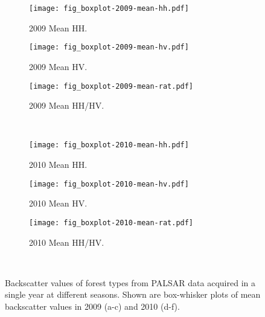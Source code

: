 \begin{landscape}
\begin{figure}[!ht] \centering
	\captionsetup[subfigure]{width=2.0in} %
	\begin{subfigure}[t]{0.43\textwidth}
		\texttt{[image: fig\_boxplot-2009-mean-hh.pdf]}
		\caption[Single year backscatter boxplots.]{2009 Mean HH.}
		\label{fig: result-box4.2a}
	\end{subfigure}
	\begin{subfigure}[t]{0.43\textwidth}
		\texttt{[image: fig\_boxplot-2009-mean-hv.pdf]}
		\caption[Single year backscatter boxplots.]{2009 Mean HV.}
		\label{fig: result-box4.2b}
	\end{subfigure}
	\begin{subfigure}[t]{0.43\textwidth}
		\texttt{[image: fig\_boxplot-2009-mean-rat.pdf]}
		\caption[Single year backscatter boxplots.]{2009 Mean HH/HV.}
		\label{fig: result-box4.2c}
	\end{subfigure}\\
	\vspace{20pt}
	\begin{subfigure}[t]{0.43\textwidth}
		\texttt{[image: fig\_boxplot-2010-mean-hh.pdf]}
		\caption[Single year backscatter boxplots.]{2010 Mean HH.}
		\label{fig: result-box4.2d}
	\end{subfigure}
	\begin{subfigure}[t]{0.43\textwidth}
		\texttt{[image: fig\_boxplot-2010-mean-hv.pdf]}
		\caption[Single year backscatter boxplots.]{2010 Mean HV.}
		\label{fig: result-box4.2e}
	\end{subfigure}
	\begin{subfigure}[t]{0.43\textwidth}
		\texttt{[image: fig\_boxplot-2010-mean-rat.pdf]}
		\caption[Single year backscatter boxplots.]{2010 Mean HH/HV.}
		\label{fig: result-box4.2f}
	\end{subfigure}\\
	\vspace{20pt}
	\caption[Backscatter values of forest types from PALSAR data acquired in a single year at different seasons.]{Backscatter values of forest types from PALSAR data acquired in a single year at different seasons. Shown are box-whisker plots of mean backscatter values in 2009 (a-c) and 2010 (d-f).}
	\label{fig: result-box4.2}
\end{figure}
\end{landscape}

